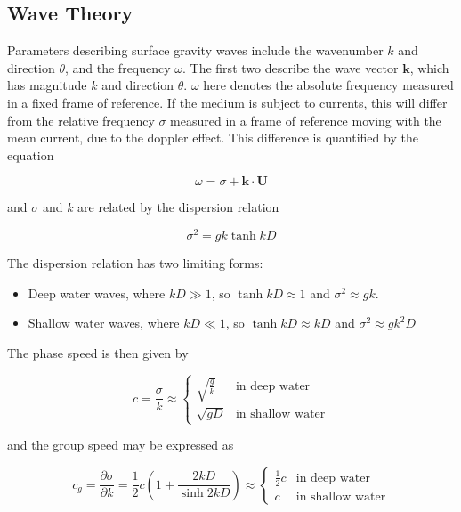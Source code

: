 
\subsection{Wave Theory}

Parameters describing surface gravity waves include the wavenumber $k$ and direction $\theta$, and the frequency $\omega$. The first two describe the wave vector $\mathbf{k}$, which has magnitude $k$ and direction $\theta$. $\omega$ here denotes the absolute frequency measured in a fixed frame of reference. If the medium is subject to currents, this will differ from the relative frequency $\sigma$ measured in a frame of reference moving with the mean current, due to the doppler effect. This difference is quantified by the equation

\begin{equation}
    \omega = \sigma + \mathbf{k} \cdot \mathbf{U}
    \label{eqn:doppler}
\end{equation}

and $\sigma$ and $k$ are related by the dispersion relation

\begin{equation}
    \sigma^2 = gk\tanh{kD}
    \label{eqn:disprel}
\end{equation}

The dispersion relation has two limiting forms:

\begin{itemize}
    \item Deep water waves, where $kD \gg 1$, so $\tanh{kD} \approx 1$ and $\sigma^2 \approx gk$.
    \item Shallow water waves, where $kD \ll 1$, so $\tanh{kD} \approx kD$ and $\sigma^2 \approx gk^2D$
\end{itemize}

The phase speed is then given by

\begin{equation}
c = \frac{\sigma}{k} \approx \begin{cases}
            \sqrt{\frac{g}{k}} & \text{in deep water} \\
            \sqrt{gD} & \text{in shallow water}
\end{cases}
\end{equation}

and the group speed may be expressed as

\begin{equation}
c_g = \frac{\partial\sigma}{\partial k} = \frac{1}{2}c \left(1 + \frac{2kD}{\sinh{2kD}} \right) \approx \begin{cases}
    \frac{1}{2} c & \text{in deep water} \\
    c & \text{in shallow water}
\end{cases}
\end{equation}

